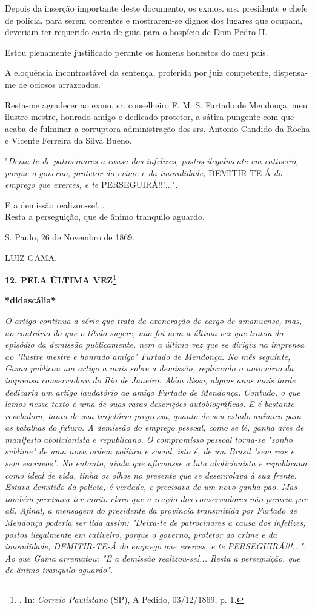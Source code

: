Depois da inserção importante deste documento, os exmos. srs. presidente
e chefe de polícia, para serem coerentes e mostrarem-se dignos dos
lugares que ocupam, deveriam ter requerido carta de guia para o hospício
de Dom Pedro II.

Estou plenamente justificado perante os homens honestos do meu país.

A eloquência incontrastável da sentença, proferida por juiz competente,
dispensa-me de ociosos arrazoados.

Resta-me agradecer ao exmo. sr. conselheiro F. M. S. Furtado de
Mendonça, meu ilustre mestre, honrado amigo e dedicado protetor, a
sátira pungente com que acaba de fulminar a corruptora administração dos
srs. Antonio Candido da Rocha e Vicente Ferreira da Silva Bueno.

"\emph{Deixa-te de patrocinares a causa dos infelizes, postos
ilegalmente em cativeiro, porque o governo, protetor do crime e da
imoralidade,} DEMITIR-TE-Á \emph{do emprego que exerces, e te}
PERSEGUIRÁ!!!...".

E a demissão realizou-se!...\\
Resta a perseguição, que de ânimo tranquilo aguardo.

S. Paulo, 26 de Novembro de 1869.

LUIZ GAMA.

\textbf{12. PELA ÚLTIMA VEZ}\footnote{. In: \emph{Correio Paulistano}
  (SP), A Pedido, 03/12/1869, p. 1.}

\textbf{*didascália*}

\emph{O artigo continua a série que trata da exoneração do cargo de
amanuense, mas, ao contrário do que o título sugere, não foi nem a
última vez que tratou do episódio da demissão publicamente, nem a última
vez que se dirigiu na imprensa ao "ilustre mestre e honrado amigo"
Furtado de Mendonça. No mês seguinte, Gama publicou um artigo a mais
sobre a demissão, replicando o noticiário da imprensa conservadora do
Rio de Janeiro. Além disso, alguns anos mais tarde dedicaria um artigo
laudatório ao amigo Furtado de Mendonça. Contudo, o que lemos nesse
texto é uma de suas raras descrições autobiográficas. E é bastante
reveladora, tanto de sua trajetória pregressa, quanto de seu estado
anímico para as batalhas do futuro. A demissão do emprego pessoal, como
se lê, ganha ares de manifesto abolicionista e republicano. O
compromisso pessoal torna-se "sonho sublime" de uma nova ordem política
e social, isto é, de um Brasil "sem reis e sem escravos". No entanto,
ainda que afirmasse a luta abolicionista e republicana como ideal de
vida, tinha os olhos no presente que se desenrolava à sua frente. Estava
demitido da polícia, é verdade, e precisava de um novo ganha-pão. Mas
também precisava ter muito claro que a reação dos conservadores não
pararia por ali. Afinal, a mensagem do presidente da província
transmitida por Furtado de Mendonça poderia ser lida assim: "Deixa-te de
patrocinares a causa dos infelizes, postos ilegalmente em cativeiro,
porque o governo, protetor do crime e da imoralidade, DEMITIR-TE-Á do
emprego que exerces, e te PERSEGUIRÁ!!!...". Ao que Gama arrematou: "E a
demissão realizou-se!... Resta a perseguição, que de ânimo tranquilo
aguardo".}

